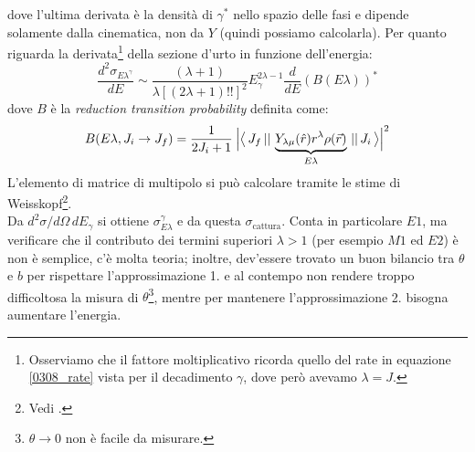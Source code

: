 dove l'ultima derivata è la densità di $\gamma^*$ nello spazio delle fasi e dipende solamente dalla cinematica, non da $Y$ (quindi possiamo calcolarla). Per quanto riguarda la derivata\footnote{Osserviamo che il fattore moltiplicativo ricorda quello del rate in equazione \eqref{0308_rate} vista per il decadimento $\gamma$, dove però avevamo $\lambda = J$.} della sezione d'urto in funzione dell'energia:
$$\frac{d^2\sigma_{E\lambda^\gamma}}{dE} \sim \frac{(\lambda +1)}{\lambda[(2\lambda + 1)!!]^2} E_\gamma^{2\lambda -1} \frac{d}{dE}(B(E\lambda))^*$$
dove $B$ è la \textit{reduction transition probability} definita come:
$$B(E\lambda, J_i \to J_f) = \frac{1}{2J_i +1 } \: \Bigl | \bigl\langle\, J_f\, ||\,\underbrace{Y_{\lambda \mu}(\hat{r}) r^\lambda \rho(\vec{r})}_{E\lambda}\, ||\,J_i\, \bigr\rangle \Bigr |^2$$
L'elemento di matrice di multipolo si può calcolare tramite le stime di Weisskopf\footnote{Vedi .}.\\
Da $d^2\sigma/d\Omega\,dE_\gamma$ si ottiene $\sigma_{E\lambda}^\gamma$ e da questa $\sigma_\text{cattura}$. Conta in particolare $E1$, ma verificare che il contributo dei termini superiori $\lambda >1$ (per esempio $M1$ ed $E2$) è  non è semplice, c'è molta teoria; inoltre, dev'essere trovato un buon bilancio tra $\theta$ e $b$ per rispettare l'approssimazione 1. e al contempo non rendere troppo difficoltosa la misura di $\theta$\footnote{$\theta\to 0$ non è facile da misurare.}, mentre per mantenere l'approssimazione 2. bisogna aumentare l'energia.

